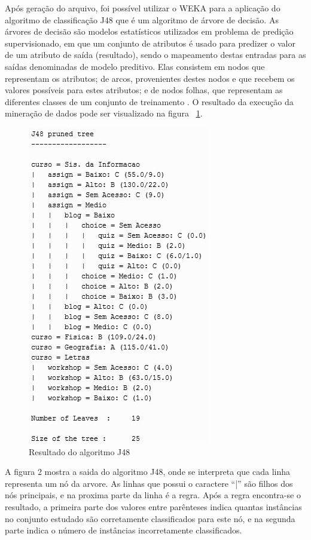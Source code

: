 \documentclass[12pt]{article}
\begin{document}
Após geração do arquivo, foi possível utilizar o WEKA para a aplicação do algoritmo de classificação J48 que é um algoritmo de árvore de decisão. As árvores de decisão são modelos estatísticos utilizados em problema de predição supervisionado, em que um conjunto de atributos é usado para predizer o valor de um atributo de saída (resultado), sendo o mapeamento destas entradas para as saídas denominadas de modelo preditivo\cite{Onoda:12}. Elas consistem em nodos que representam os atributos; de arcos, provenientes destes nodos e que recebem os valores possíveis para estes atributos; e de nodos folhas, que representam as diferentes classes de um conjunto de treinamento \cite{Shiba:13}. O resultado da execução da mineração de dados pode ser visualizado na figura ~\ref{fig:ResultJ48}. 
\begin{figure}[ht]
\centering
\includegraphics[width=.4\textwidth]{ResultJ48.jpg}
\caption{Resultado do algoritmo J48}
\label{fig:ResultJ48}
\end{figure}
A figura 2 mostra a saida do algoritmo J48, onde se interpreta que cada linha representa um nó da arvore. As linhas que possui o caractere ``{|}'' são filhos dos nós principais, e na proxima parte da linha é a regra. Após a regra encontra-se o resultado, a primeira parte dos valores entre parênteses indica quantas instâncias no conjunto estudado são corretamente classificados para este nó, e na segunda parte indica o número de instâncias incorretamente classificados. 
\end{document}
